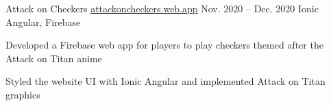 
\begin{cvprojects}


  \cvproject
  {Attack on Checkers}
  {\href{https://github.com/lixinwei123/SE181}{attackoncheckers.web.app}}
  {Nov. 2020 -- Dec. 2020}
  {Ionic Angular, Firebase}
  {
    \begin{cvitems}
      \item Developed a Firebase web app for players to play checkers themed after the Attack on Titan anime
      \item Styled the website UI with Ionic Angular and implemented Attack on Titan graphics
    \end{cvitems}
  }



\end{cvprojects}
